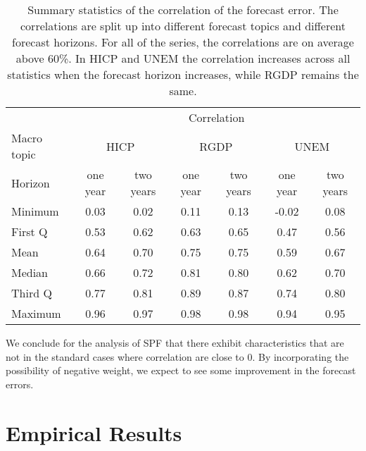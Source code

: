 \documentclass[11pt]{article}
\begin{document}
\begin{table}[!h]
	\centering
	\caption{Summary statistics of the correlation of the forecast error. The correlations are split up into different forecast topics and different forecast horizons. For all of the series, the correlations are on average above 60\%. In HICP and UNEM the correlation increases across all statistics when the forecast horizon increases, while RGDP remains the same.}
	\label{tab: correlation summary statistics}
	\begin{tabular}{lcccccc}%
		\hline
		&\multicolumn{6}{c}{Correlation}\\
		\cmidrule(lr){2-7}
		Macro topic & \multicolumn{2}{c}{HICP} & \multicolumn{2}{c}{RGDP} & \multicolumn{2}{c}{UNEM} \\
		\cmidrule(lr){2-3} \cmidrule(lr){4-5}\cmidrule(lr){6-7}
		Horizon     & one year & two years & one year & two years & one year & two years \\ 
		\hline
		Minimum     & 0.03        & 0.02        & 0.11        & 0.13        & -0.02        & 0.08       \\
		First Q     & 0.53        & 0.62        & 0.63        & 0.65        & 0.47         & 0.56       \\
		Mean        & 0.64        & 0.70        & 0.75        & 0.75        & 0.59         & 0.67       \\
		Median      & 0.66        & 0.72        & 0.81        & 0.80        & 0.62         & 0.70       \\
		Third Q     & 0.77        & 0.81        & 0.89        & 0.87        & 0.74         & 0.80       \\
		Maximum     & 0.96        & 0.97        & 0.98        & 0.98        & 0.94         & 0.95       \\ 
		\hline
	\end{tabular}
\end{table}


We conclude for the analysis of SPF that there exhibit characteristics that are not in the standard cases where correlation are close to 0. By incorporating the possibility of negative weight, we expect to see some improvement in the forecast errors.

\section{Empirical Results}\label{empirical-results}
\end{document}
